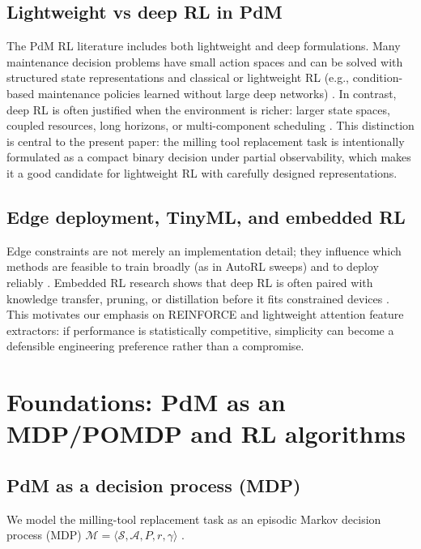 \documentclass[11pt]{article}
\begin{document}
\subsection{Lightweight vs deep RL in PdM}
The PdM RL literature includes both lightweight and deep formulations. Many maintenance decision problems have small action spaces and can be solved with structured state representations and classical or lightweight RL (e.g., condition-based maintenance policies learned without large deep networks) \parencite{Adsule2020CBMRL, Yousefi2020QualityEngineering}. In contrast, deep RL is often justified when the environment is richer: larger state spaces, coupled resources, long horizons, or multi-component scheduling \parencite{Liu2020EJOR, LeeMitici2022RESS, Chen2023IISE, Ong2022TransferDRL}. This distinction is central to the present paper: the milling tool replacement task is intentionally formulated as a compact binary decision under partial observability, which makes it a good candidate for lightweight RL with carefully designed representations.

\subsection{Edge deployment, TinyML, and embedded RL}
Edge constraints are not merely an implementation detail; they influence which methods are feasible to train broadly (as in AutoRL sweeps) and to deploy reliably \parencite{Compare2020IoT, Njor2024TinyML, Pandey2023EdgeDNN}. Embedded RL research shows that deep RL is often paired with knowledge transfer, pruning, or distillation before it fits constrained devices \parencite{Jang2020KnowledgeTransfer, Szydlo2022TinyRL, Xu2022ISORC}. This motivates our emphasis on REINFORCE and lightweight attention feature extractors: if performance is statistically competitive, simplicity can become a defensible engineering preference rather than a compromise.

\section{Foundations: PdM as an MDP/POMDP and RL algorithms}
\label{sec:foundations}
\subsection{PdM as a decision process (MDP)}
\label{sec:mdp}
We model the milling-tool replacement task as an episodic Markov decision process (MDP)
$\mathcal{M}=\langle \mathcal{S},\mathcal{A},P,r,\gamma\rangle$ \parencite{SuttonBarto2018}.
\end{document}
